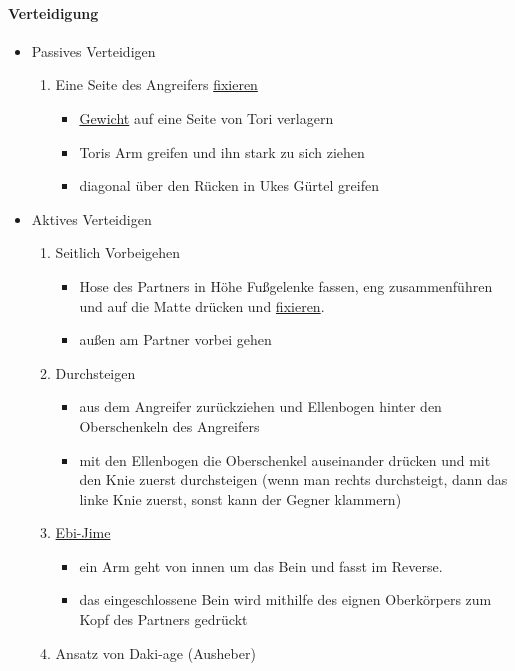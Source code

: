 \documentclass[justified, a4paper, notitlepage, captions=tableheading, nobib]{tufte-handout}
\begin{document}
\paragraph{Verteidigung}
\label{sec:org425e4d3}
\begin{itemize}
\item Passives Verteidigen
\begin{enumerate}
\item Eine Seite des Angreifers \hyperref[org62822f6]{fixieren}
\begin{itemize}
\item \hyperref[org889513a]{Gewicht} auf eine Seite von Tori verlagern
\item Toris Arm greifen und ihn stark zu sich ziehen
\item diagonal über den Rücken in Ukes Gürtel greifen
\end{itemize}
\end{enumerate}
\item Aktives Verteidigen
\begin{enumerate}
\item Seitlich Vorbeigehen
\begin{itemize}
\item Hose des Partners in Höhe Fußgelenke fassen, eng zusammenführen und auf die Matte drücken und \hyperref[org62822f6]{fixieren}.
\item außen am Partner vorbei gehen
\end{itemize}
\item Durchsteigen
\begin{itemize}
\item aus dem Angreifer zurückziehen und Ellenbogen hinter den Oberschenkeln des Angreifers
\item mit den Ellenbogen die Oberschenkel auseinander drücken und mit den Knie zuerst durchsteigen (wenn man rechts durchsteigt, dann das linke Knie zuerst, sonst kann der Gegner klammern)
\end{itemize}
\item \hyperref[orgb72c4d6]{Ebi-Jime}
\begin{itemize}
\item ein Arm geht von innen um das Bein und fasst im Reverse.
\item das eingeschlossene Bein wird mithilfe des eignen Oberkörpers zum Kopf des Partners gedrückt
\end{itemize}
\item Ansatz von Daki-age (Ausheber)
\begin{itemize}

\end{itemize}
\end{enumerate}
\end{itemize}
\end{document}
